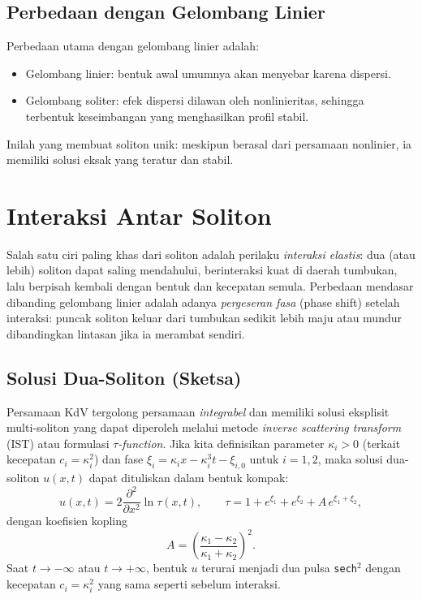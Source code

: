 \documentclass{bukumjh}
\begin{document}
\subsection*{Perbedaan dengan Gelombang Linier}
Perbedaan utama dengan gelombang linier adalah:
\begin{itemize}
  \item Gelombang linier: bentuk awal umumnya akan menyebar karena dispersi.
  \item Gelombang soliter: efek dispersi dilawan oleh nonlinieritas, sehingga terbentuk keseimbangan yang menghasilkan profil stabil.
\end{itemize}

Inilah yang membuat soliton unik: meskipun berasal dari persamaan nonlinier, ia memiliki solusi eksak yang teratur dan stabil.

\section{Interaksi Antar Soliton}

Salah satu ciri paling khas dari soliton adalah perilaku \emph{interaksi elastis}: dua (atau lebih) soliton dapat saling mendahului, berinteraksi kuat di daerah tumbukan, lalu berpisah kembali dengan bentuk dan kecepatan semula. 
Perbedaan mendasar dibanding gelombang linier adalah adanya \emph{pergeseran fasa} (phase shift) setelah interaksi: puncak soliton keluar dari tumbukan sedikit lebih maju atau mundur dibandingkan lintasan jika ia merambat sendiri.

\subsection*{Solusi Dua-Soliton (Sketsa)}
Persamaan KdV tergolong persamaan \emph{integrabel} dan memiliki solusi eksplisit multi-soliton yang dapat diperoleh melalui metode \emph{inverse scattering transform} (IST) atau formulasi \emph{$\tau$-function}. 
Jika kita definisikan parameter $\kappa_i>0$ (terkait kecepatan $c_i=\kappa_i^2$) dan fase $\xi_i = \kappa_i x - \kappa_i^3 t - \xi_{i,0}$ untuk $i=1,2$, maka solusi dua-soliton $u(x,t)$ dapat dituliskan dalam bentuk kompak:
\[
u(x,t) = 2\frac{\partial^2}{\partial x^2}\ln \tau(x,t), \qquad 
\tau = 1 + e^{\xi_1} + e^{\xi_2} + A\, e^{\xi_1+\xi_2},
\]
dengan koefisien kopling
\[
A=\left(\frac{\kappa_1-\kappa_2}{\kappa_1+\kappa_2}\right)^2.
\]
Saat $t\to -\infty$ atau $t\to +\infty$, bentuk $u$ terurai menjadi dua pulsa \texttt{sech}$^2$ dengan kecepatan $c_i=\kappa_i^2$ yang sama seperti sebelum interaksi.
\end{document}

